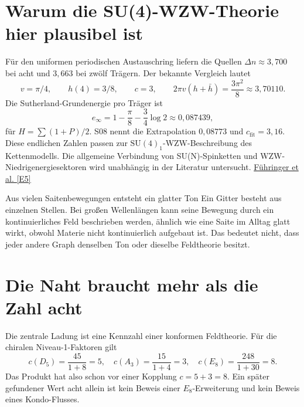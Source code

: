 \section{Warum die SU(4)-WZW-Theorie hier plausibel ist}
Für den uniformen periodischen Austauschring liefern die Quellen $\Delta n\approx3{,}700$ bei acht und $3{,}663$ bei zwölf Trägern. Der bekannte Vergleich lautet
\begin{equation}
v=\pi/4,\qquad h(4)=3/8,\qquad c=3,
\qquad 2\pi v(h+\bar h)=\frac{3\pi^2}{8}\approx3{,}70110.
\end{equation}
Die Sutherland-Grundenergie pro Träger ist
\begin{equation}
e_\infty=1-\frac{\pi}{8}-\frac34\log2\approx0{,}087439,
\end{equation}
für $H=\sum(1+P)/2$. S08 nennt die Extrapolation $0{,}08773$ und $c_{\mathrm{fit}}=3{,}16$. Diese endlichen Zahlen passen zur $\mathrm{SU}(4)_1$-WZW-Beschreibung des Kettenmodells. Die allgemeine Verbindung von SU(N)-Spinketten und WZW-Niedrigenergiesektoren wird unabhängig in der Literatur untersucht. \href{https://arxiv.org/abs/0806.2563}{Führinger et al. [E5]}

\begin{bild}{Aus vielen Saitenbewegungen entsteht ein glatter Ton}
Ein Gitter besteht aus einzelnen Stellen. Bei großen Wellenlängen kann seine Bewegung durch ein kontinuierliches Feld beschrieben werden, ähnlich wie eine Saite im Alltag glatt wirkt, obwohl Materie nicht kontinuierlich aufgebaut ist. Das bedeutet nicht, dass jeder andere Graph denselben Ton oder dieselbe Feldtheorie besitzt.
\end{bild}

\section{Die Naht braucht mehr als die Zahl acht}
Die zentrale Ladung ist eine Kennzahl einer konformen Feldtheorie. Für die chiralen Niveau-1-Faktoren gilt
\begin{equation}
c(D_5)=\frac{45}{1+8}=5,\quad
c(A_3)=\frac{15}{1+4}=3,\quad
c(E_8)=\frac{248}{1+30}=8.
\end{equation}
Das Produkt hat also schon vor einer Kopplung $c=5+3=8$. Ein später gefundener Wert acht allein ist kein Beweis einer $E_8$-Erweiterung und kein Beweis eines Kondo-Flusses.

